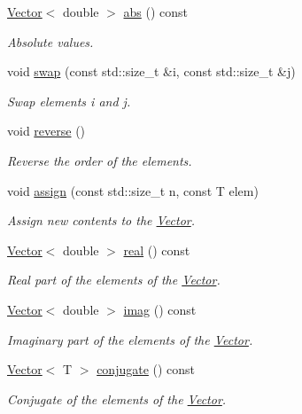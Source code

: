 \begin{DoxyCompactItemize}
\hyperlink{classLuna_1_1Vector}{Vector}$<$ double $>$ \hyperlink{classLuna_1_1Vector_a1fe66d19f6641be9e301a306fdb58cbe}{abs} () const
\begin{DoxyCompactList}\small\item\em Absolute values. \end{DoxyCompactList}\item 
void \hyperlink{classLuna_1_1Vector_af910058597a627cc4257ea668e916b90}{swap} (const std\+::size\+\_\+t \&i, const std\+::size\+\_\+t \&j)
\begin{DoxyCompactList}\small\item\em Swap elements i and j. \end{DoxyCompactList}\item 
void \hyperlink{classLuna_1_1Vector_a0e051d73b35c094dddef2ea46b4935df}{reverse} ()
\begin{DoxyCompactList}\small\item\em Reverse the order of the elements. \end{DoxyCompactList}\item 
void \hyperlink{classLuna_1_1Vector_ac543e0e7e7add55358f976f0baabbae3}{assign} (const std\+::size\+\_\+t n, const T elem)
\begin{DoxyCompactList}\small\item\em Assign new contents to the \hyperlink{classLuna_1_1Vector}{Vector}. \end{DoxyCompactList}\item 
\hyperlink{classLuna_1_1Vector}{Vector}$<$ double $>$ \hyperlink{classLuna_1_1Vector_a39fa58d9f5fdca76b6ffa6cc481f9284}{real} () const
\begin{DoxyCompactList}\small\item\em Real part of the elements of the \hyperlink{classLuna_1_1Vector}{Vector}. \end{DoxyCompactList}\item 
\hyperlink{classLuna_1_1Vector}{Vector}$<$ double $>$ \hyperlink{classLuna_1_1Vector_afde9791d85dd530a0e1c9794e8c6534e}{imag} () const
\begin{DoxyCompactList}\small\item\em Imaginary part of the elements of the \hyperlink{classLuna_1_1Vector}{Vector}. \end{DoxyCompactList}\item 
\hyperlink{classLuna_1_1Vector}{Vector}$<$ T $>$ \hyperlink{classLuna_1_1Vector_a17316bfedb7386a960206e0b0f22ecb4}{conjugate} () const
\begin{DoxyCompactList}\small\item\em Conjugate of the elements of the \hyperlink{classLuna_1_1Vector}{Vector}. \end{DoxyCompactList}\item 

\end{DoxyCompactItemize}
